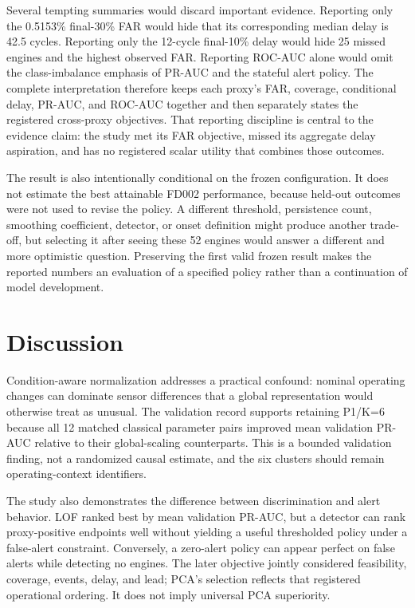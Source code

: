 \documentclass[11pt]{article}
\begin{document}
Several tempting summaries would discard important evidence. Reporting only the 0.5153\% final-30\% FAR would hide that its corresponding median delay is 42.5 cycles. Reporting only the 12-cycle final-10\% delay would hide 25 missed engines and the highest observed FAR. Reporting ROC-AUC alone would omit the class-imbalance emphasis of PR-AUC and the stateful alert policy. The complete interpretation therefore keeps each proxy's FAR, coverage, conditional delay, PR-AUC, and ROC-AUC together and then separately states the registered cross-proxy objectives. That reporting discipline is central to the evidence claim: the study met its FAR objective, missed its aggregate delay aspiration, and has no registered scalar utility that combines those outcomes.


The result is also intentionally conditional on the frozen configuration. It does not estimate the best attainable FD002 performance, because held-out outcomes were not used to revise the policy. A different threshold, persistence count, smoothing coefficient, detector, or onset definition might produce another trade-off, but selecting it after seeing these 52 engines would answer a different and more optimistic question. Preserving the first valid frozen result makes the reported numbers an evaluation of a specified policy rather than a continuation of model development.


\section{Discussion}


Condition-aware normalization addresses a practical confound: nominal operating changes can dominate sensor differences that a global representation would otherwise treat as unusual. The validation record supports retaining P1/K=6 because all 12 matched classical parameter pairs improved mean validation PR-AUC relative to their global-scaling counterparts. This is a bounded validation finding, not a randomized causal estimate, and the six clusters should remain operating-context identifiers.


The study also demonstrates the difference between discrimination and alert behavior. LOF ranked best by mean validation PR-AUC, but a detector can rank proxy-positive endpoints well without yielding a useful thresholded policy under a false-alert constraint. Conversely, a zero-alert policy can appear perfect on false alerts while detecting no engines. The later objective jointly considered feasibility, coverage, events, delay, and lead; PCA's selection reflects that registered operational ordering. It does not imply universal PCA superiority.
\end{document}
